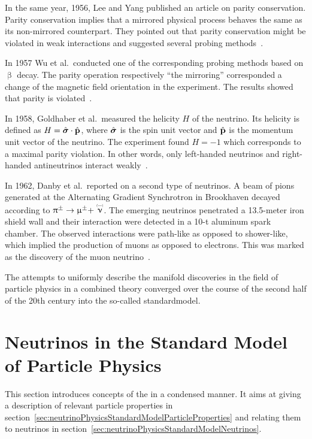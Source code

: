 In the same year, 1956, Lee and Yang published an article on parity conservation. Parity conservation implies that a mirrored physical process behaves the same as its non-mirrored counterpart. They pointed out that parity conservation might be violated in weak interactions and suggested several probing methods~\cite{Lee1956}. 

In 1957 Wu et al.~conducted one of the corresponding probing methods based on $\upbeta$ decay. The parity operation respectively ``the mirroring'' corresponded a change of the magnetic field orientation in the experiment. The results showed that parity is violated~\cite{Wu1957}. 

In 1958, Goldhaber et al.~measured the helicity $H$ of the neutrino. Its helicity is defined as $ H = \hat{\boldsymbol{\mathbf{\sigma}}} \cdot \hat{\boldsymbol{\mathbf{p}}}$, where $\hat{\boldsymbol{\mathbf{\sigma}}}$ is the spin unit vector and $\hat{\boldsymbol{\mathbf{p}}}$ is the momentum unit vector of the neutrino. The experiment found $H = -1$ which corresponds to a maximal parity violation. In other words, only left-handed neutrinos and right-handed antineutrinos interact weakly~\cite{Goldhaber1958}.

In 1962, Danby et al.~reported on a second type of neutrinos. A beam of pions generated at the Alternating Gradient Synchrotron in Brookhaven decayed according to $\uppi^{\pm} \rightarrow \upmu^{\pm} + \maybeaneutrino$. The emerging neutrinos penetrated a 13.5-meter iron shield wall and their interaction were detected in a 10-t aluminum spark chamber. The observed interactions were path-like as opposed to shower-like, which implied the production of muons as opposed to electrons. This was marked as the discovery of the muon neutrino~\cite{Danby1962}.

The attempts to uniformly describe the manifold discoveries in the field of particle physics in a combined theory converged over the course of the second half of the 20th century into the so-called \gls{standardmodel}.
    
\section{Neutrinos in the Standard Model of Particle Physics}
\label{sec:neutrinoPhysicsStandardModel}
This section introduces concepts of the  in a condensed manner. It aims at giving a description of relevant particle properties in section~\ref{sec:neutrinoPhysicsStandardModelParticleProperties} and relating them to neutrinos in section~\ref{sec:neutrinoPhysicsStandardModelNeutrinos}.

